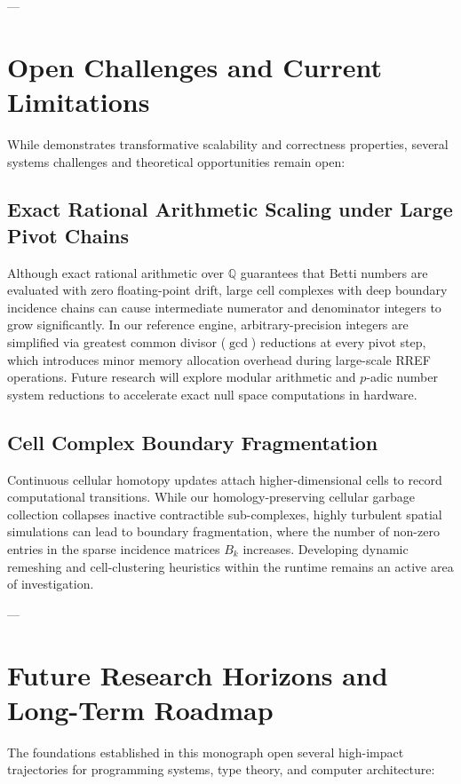 ---

\section{Open Challenges and Current Limitations}
\label{sec:open_challenges}

While \ToposLang{} demonstrates transformative scalability and correctness properties, several systems challenges and theoretical opportunities remain open:

\subsection{Exact Rational Arithmetic Scaling under Large Pivot Chains}
Although exact rational arithmetic over $\mathbb{Q}$ guarantees that Betti numbers are evaluated with zero floating-point drift, large cell complexes with deep boundary incidence chains can cause intermediate numerator and denominator integers to grow significantly. In our reference engine, arbitrary-precision integers are simplified via greatest common divisor ($\gcd$) reductions at every pivot step, which introduces minor memory allocation overhead during large-scale RREF operations. Future research will explore modular arithmetic and $p$-adic number system reductions to accelerate exact null space computations in hardware.

\subsection{Cell Complex Boundary Fragmentation}
Continuous cellular homotopy updates attach higher-dimensional cells to record computational transitions. While our homology-preserving cellular garbage collection collapses inactive contractible sub-complexes, highly turbulent spatial simulations can lead to boundary fragmentation, where the number of non-zero entries in the sparse incidence matrices $B_k$ increases. Developing dynamic remeshing and cell-clustering heuristics within the runtime remains an active area of investigation.

---

\section{Future Research Horizons and Long-Term Roadmap}
\label{sec:future_horizons}

The foundations established in this monograph open several high-impact trajectories for programming systems, type theory, and computer architecture:

